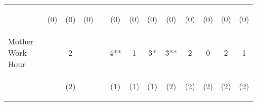 \begin{tabular}{lcccccccccccc}
 & \begin{footnotesize}(0)\end{footnotesize} & \begin{footnotesize}(0)\end{footnotesize} & \begin{footnotesize}(0)\end{footnotesize} & \begin{footnotesize}\end{footnotesize} & \begin{footnotesize}(0)\end{footnotesize} & \begin{footnotesize}(0)\end{footnotesize} & \begin{footnotesize}(0)\end{footnotesize} & \begin{footnotesize}(0)\end{footnotesize} & \begin{footnotesize}(0)\end{footnotesize} & \begin{footnotesize}(0)\end{footnotesize} & \begin{footnotesize}(0)\end{footnotesize} & \begin{footnotesize}(0)\end{footnotesize}\\
\noalign{\smallskip}Mother Work Hour &  & 2 &  &  & 4** & 1 & 3* & 3** & 2 & 0 & 2 & 1\\
 & \begin{footnotesize}\end{footnotesize} & \begin{footnotesize}(2)\end{footnotesize} & \begin{footnotesize}\end{footnotesize} & \begin{footnotesize}\end{footnotesize} & \begin{footnotesize}(1)\end{footnotesize} & \begin{footnotesize}(1)\end{footnotesize} & \begin{footnotesize}(1)\end{footnotesize} & \begin{footnotesize}(2)\end{footnotesize} & \begin{footnotesize}(2)\end{footnotesize} & \begin{footnotesize}(2)\end{footnotesize} & \begin{footnotesize}(2)\end{footnotesize} & \begin{footnotesize}(2)\end{footnotesize}\\

\end{tabular}
